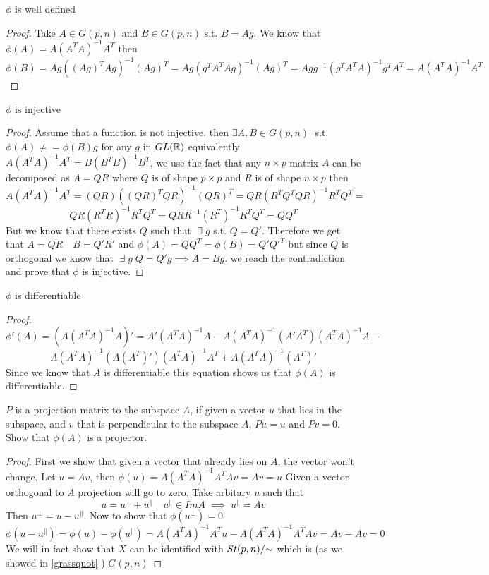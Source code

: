 \documentclass[11pt,a4paper]{report}
\begin{document}
\begin{Prop}
    $\phi$ is well defined
\end{Prop}
\begin{proof}
Take $A \in G(p,n)$ and $B \in G(p,n)$ s.t. $B = A g$. We know that $\phi(A) = A (A^T A)^{-1} A^T$ then
\begin{equation}
    \phi(B) = A g ((Ag)^T Ag)^{-1} (Ag)^{T} = A g (g^T A^T A g)^{-1} (A g)^{T} = A g g^{-1} (g^T A^T A)^{-1} g^T A^T = A (A^T A)^{-1} A^T
\end{equation}
\end{proof}
\begin{Prop}
    $\phi$ is injective
\end{Prop}
\begin{proof}
Assume that a function is not injective, then  $ \exists A, B \in G(p,n) \; $ s.t. $\phi(A) \neq = \phi(B) g$ for any $g$ in $GL(\mathbb{R})$ 
equivalently $A(A^T A)^{-1} A^T = B (B^T B)^{-1} B^T$, we use the fact that any $n \times p$ matrix $A$ can be decomposed as $A =  Q R$  where $Q$ is of shape $ p \times p$ and $R$ is of shape $n \times p$
then 
 $$ A(A^T A)^{-1} A^T =(QR) ((QR)^T QR)^{-1} (QR)^T = QR(R^T Q^T Q R)^{-1} R^T Q^T = $$
 $$ Q R (R^T R)^{-1} R^T Q^T = QRR^{-1} (R^T)^{-1} R^T Q^T = Q Q^T $$
But we know that there exists $Q$ such that $ \; \exists \; g$ s.t. $Q = Q'$. Therefore we get that $ A = Q R \quad B = Q' R'$ and $\phi(A) = Q Q^T = \phi(B) = Q' Q'^T$ but since $Q$ is orthogonal
we know that $ \; \exists \; g \; Q= Q' g \implies A = Bg$. we reach the contradiction and prove that $\phi$ is injective.
\end{proof}
\begin{Prop}
    $\phi$ is differentiable
\end{Prop}
\begin{proof}

$$\phi'(A) = (A (A^T A)^{-1} A)' = A' (A^T A)^{-1} A - A(A^T A)^{-1}(A' A^T) (A^T A)^{-1} A - $$
$$ A (A^T A)^{-1} (A (A^T)') (A^T A)^{-1} A^T + A (A^T A)^{-1} (A^T)'$$
Since we know that $A$ is differentiable this equation shows us that $\phi(A)$ is differentiable.

\end{proof}
\begin{Prop}
$P$ is a projection matrix to the subspace $A$, if given a vector $u$ that lies in the subspace, and $v$ that is perpendicular to the subspace $A$,
$Pu=u$ and $P v= 0$.
Show that $\phi(A)$ is a projector.
\end{Prop}
\begin{proof}
First we show that given a vector that already lies on $A$, the vector won't change.
Let $u = A v$, then $\phi(u) = A (A^T A)^{-1} A^T A v = A v = u$
Given a vector orthogonal to $A$ projection will go to zero. Take arbitary $u$ such that
$$ u = u^{\perp} + u^{\parallel} \quad u^{\parallel} \in Im A \; \implies \; u^{\parallel} = A v $$
Then $ u^{\perp} = u - u^{\parallel}$. Now to show that $\phi(u^{\perp}) = 0$
$$ \phi(u - u^{\parallel}) = \phi(u) - \phi(u^{\parallel}) = A (A^T A)^{-1} A^T u - A (A^T A)^{-1} A^T A v = Av - Av = 0 $$
We will in fact show that $X$ can be identified with $St(p,n)/{\sim}$ which is (as we showed in \ref{grassquot} ) $G(p,n)$
\end{proof}
\end{document}

